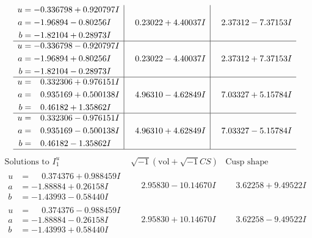 \documentclass[1p]{elsarticle_modified}
\theoremstyle{definition}
\newcommand{\I}{\sqrt{-1}}
\begin{document}
$$\begin{array}{c|c|c}
\begin{aligned}
u &= -0.336798 + 0.920797 I \\
a &= -1.96894 - 0.80256 I \\
b &= -1.82104 + 0.28973 I\end{aligned}
 & \phantom{-}0.23022 + 4.40037 I & \phantom{-}2.37312 - 7.37153 I \\ \hline\begin{aligned}
u &= -0.336798 - 0.920797 I \\
a &= -1.96894 + 0.80256 I \\
b &= -1.82104 - 0.28973 I\end{aligned}
 & \phantom{-}0.23022 - 4.40037 I & \phantom{-}2.37312 + 7.37153 I \\ \hline\begin{aligned}
u &= \phantom{-}0.332306 + 0.976151 I \\
a &= \phantom{-}0.935169 + 0.500138 I \\
b &= \phantom{-}0.46182 + 1.35862 I\end{aligned}
 & \phantom{-}4.96310 - 4.62849 I & \phantom{-}7.03327 + 5.15784 I \\ \hline\begin{aligned}
u &= \phantom{-}0.332306 - 0.976151 I \\
a &= \phantom{-}0.935169 - 0.500138 I \\
b &= \phantom{-}0.46182 - 1.35862 I\end{aligned}
 & \phantom{-}4.96310 + 4.62849 I & \phantom{-}7.03327 - 5.15784 I\\
 \hline 
 \end{array}$$\newpage$$\begin{array}{c|c|c}  
\text{Solutions to }I^u_{1}& \I (\text{vol} + \sqrt{-1}CS) & \text{Cusp shape}\\
 \hline 
\begin{aligned}
u &= \phantom{-}0.374376 + 0.988459 I \\
a &= -1.88884 + 0.26158 I \\
b &= -1.43993 - 0.58440 I\end{aligned}
 & \phantom{-}2.95830 - 10.14670 I & \phantom{-}3.62258 + 9.49522 I \\ \hline\begin{aligned}
u &= \phantom{-}0.374376 - 0.988459 I \\
a &= -1.88884 - 0.26158 I \\
b &= -1.43993 + 0.58440 I\end{aligned}
 & \phantom{-}2.95830 + 10.14670 I & \phantom{-}3.62258 - 9.49522 I \\ \hline\begin{aligned}

\end{aligned}
\end{array}$$
\end{document}
